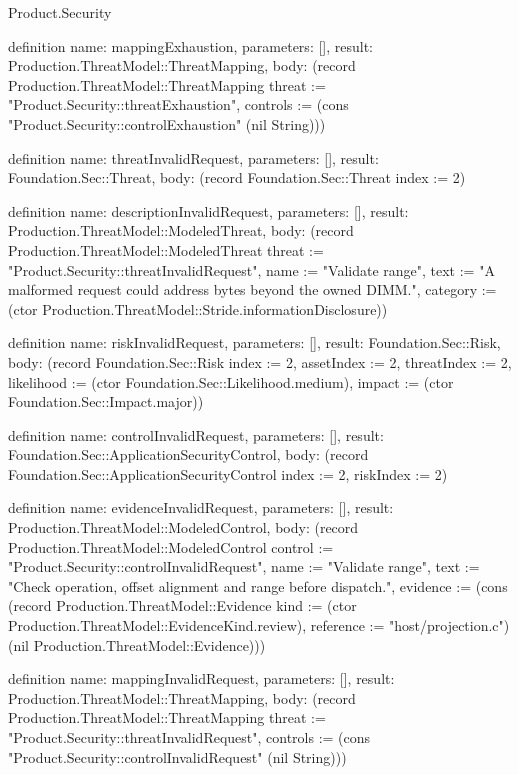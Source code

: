 \begin{lexlean}{Product.Security}
\begin{semanticmodule}
definition{
  name: mappingExhaustion, parameters: [], result: Production.ThreatModel::ThreatMapping,
  body: (record Production.ThreatModel::ThreatMapping {threat := "Product.Security::threatExhaustion", controls := (cons "Product.Security::controlExhaustion" (nil String))})
}

definition{
  name: threatInvalidRequest, parameters: [], result: Foundation.Sec::Threat,
  body: (record Foundation.Sec::Threat {index := 2})
}

definition{
  name: descriptionInvalidRequest, parameters: [], result: Production.ThreatModel::ModeledThreat,
  body: (record Production.ThreatModel::ModeledThreat {threat := "Product.Security::threatInvalidRequest", name := "Validate range", text := "A malformed request could address bytes beyond the owned DIMM.", category := (ctor Production.ThreatModel::Stride.informationDisclosure)})
}

definition{
  name: riskInvalidRequest, parameters: [], result: Foundation.Sec::Risk,
  body: (record Foundation.Sec::Risk {index := 2, assetIndex := 2, threatIndex := 2, likelihood := (ctor Foundation.Sec::Likelihood.medium), impact := (ctor Foundation.Sec::Impact.major)})
}

definition{
  name: controlInvalidRequest, parameters: [], result: Foundation.Sec::ApplicationSecurityControl,
  body: (record Foundation.Sec::ApplicationSecurityControl {index := 2, riskIndex := 2})
}

definition{
  name: evidenceInvalidRequest, parameters: [], result: Production.ThreatModel::ModeledControl,
  body: (record Production.ThreatModel::ModeledControl {control := "Product.Security::controlInvalidRequest", name := "Validate range", text := "Check operation, offset alignment and range before dispatch.", evidence := (cons (record Production.ThreatModel::Evidence {kind := (ctor Production.ThreatModel::EvidenceKind.review), reference := "host/projection.c"}) (nil Production.ThreatModel::Evidence))})
}

definition{
  name: mappingInvalidRequest, parameters: [], result: Production.ThreatModel::ThreatMapping,
  body: (record Production.ThreatModel::ThreatMapping {threat := "Product.Security::threatInvalidRequest", controls := (cons "Product.Security::controlInvalidRequest" (nil String))})
}


\end{semanticmodule}
\end{lexlean}
